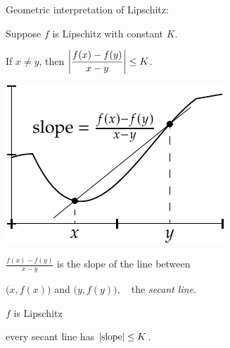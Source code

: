 \documentclass[10pt,aspectratio=149]{beamer}
\begin{document}
\begin{frame}
Geometric interpretation of Lipschitz:

\pause
\medskip

Suppose $f$ is Lipschitz with constant $K$.

\pause
\medskip

If $x \not= y$, then
\quad
$\displaystyle
\left\lvert {\frac{f(x)-f(y)}{x-y}} \right\rvert \leq K$.

\pause
\vspace*{-0.3in}
\hspace*{2.5in}
\includegraphics{../figures/lipschitzfig}

\vspace*{-1.0in}

$\frac{f(x)-f(y)}{x-y}$ is the slope of the line
between

$\bigl(x,f(x)\bigr)$ and $\bigl(y,f(y)\bigr)$,
~
the \emph{secant line}.

\pause
\medskip

$f$ is Lipschitz

\wiffif

every secant line has $\left\lvert {\text{slope}} \right\rvert \leq K$.

\end{frame}
\end{document}
